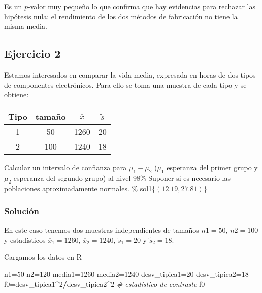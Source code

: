 \documentclass[
]{article}
\newenvironment{Shaded}{\begin{snugshade}}{\end{snugshade}}
\newcommand{\CommentTok}[1]{\textcolor[rgb]{0.56,0.35,0.01}{\textit{#1}}}
\newcommand{\DecValTok}[1]{\textcolor[rgb]{0.00,0.00,0.81}{#1}}
\newcommand{\NormalTok}[1]{#1}
\newcommand{\OperatorTok}[1]{\textcolor[rgb]{0.81,0.36,0.00}{\textbf{#1}}}
\begin{document}
Es un \(p\)-valor muy pequeño lo que confirma que hay evidencias para
rechazar las hipótesis nula: el rendimiento de los dos métodos de
fabricación no tiene la misma media.

\hypertarget{ejercicio-2}{%
\subsection{Ejercicio 2}\label{ejercicio-2}}

Estamos interesados en comparar la vida media, expresada en horas de dos
tipos de componentes electrónicos. Para ello se toma una muestra de cada
tipo y se obtiene:

\begin{center}
\begin{tabular}{|c|c|c|c|}
\hline Tipo & tamaño & $\overline{x}$ & $\tilde{s}$\\ \hline \hline 1 & 50 & 1260 & 20\\ \hline 2 &
100 & 1240 & 18\\ \hline
\end{tabular}
\end{center}

Calcular un intervalo de confianza para \(\mu_{1}-\mu_{2}\) (\(\mu_{1}\)
esperanza del primer grupo y \(\mu_{2}\) esperanza del segundo grupo) al
nivel 98\% Suponer si es necesario las poblaciones aproximadamente
normales. \% sol1\{\(\left(12.19,27.81\right)\)\}

\hypertarget{soluciuxf3n-1}{%
\subsubsection{Solución}\label{soluciuxf3n-1}}

En este caso tenemos dos muestras independientes de tamaños \(n1=50\),
\(n2=100\) y estadísticos \(\overline{x}_1=1260\),
\(\overline{x}_2=1240\), \(\tilde{s}_1=20\) y \(\tilde{s}_2=18\).

Cargamos los datos en R

\begin{Shaded}
\begin{Highlighting}[]
\NormalTok{n1=}\DecValTok{50}
\NormalTok{n2=}\DecValTok{120}
\NormalTok{media1=}\DecValTok{1260}
\NormalTok{media2=}\DecValTok{1240}
\NormalTok{desv_tipica1=}\DecValTok{20}
\NormalTok{desv_tipica2=}\DecValTok{18}
\NormalTok{f0=desv_tipica1}\OperatorTok{^}\DecValTok{2}\OperatorTok{/}\NormalTok{desv_tipica2}\OperatorTok{^}\DecValTok{2} \CommentTok{# estadístico de contraste}
\NormalTok{f0}
\end{Highlighting}
\end{Shaded}
\end{document}
